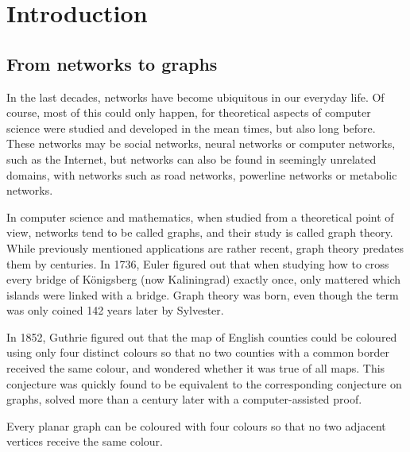                    
\chapter{Introduction}

\section{From networks to graphs}

In the last decades, networks have become ubiquitous in our everyday life. Of course, most of this could only happen, for theoretical aspects of computer science were studied and developed in the mean times, but also long before. These networks may be social networks, neural networks or computer networks, such as the Internet, but networks can also be found in seemingly unrelated domains, with networks such as road networks, powerline networks or metabolic networks.
\smallskip

In computer science and mathematics, when studied from a theoretical point of view, networks tend to be called graphs, and their study is called graph theory. While previously mentioned applications are rather recent, graph theory predates them by centuries. In 1736, Euler figured out that when studying how to cross every bridge of K\"onigsberg (now Kaliningrad) exactly once, only mattered which islands were linked with a bridge. Graph theory was born, even though the term was only coined 142 years later by Sylvester.

\medskip
 
In 1852, Guthrie figured out that the map of English counties could be coloured using only four distinct colours so that no two counties with a common border received the same colour, and wondered whether it was true of all maps. This conjecture was quickly found to be equivalent to the corresponding conjecture on graphs, solved more than a century later with a computer-assisted proof.

\begin{theorem}\label{thm:four_colours}
Every planar graph can be coloured with four colours so that no two adjacent vertices receive the same colour.
\end{theorem}


